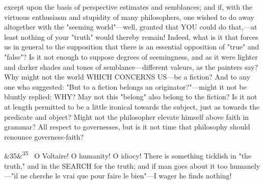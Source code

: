 \documentclass[12pt]{article}
\newcommand{\para}[1][]{\par\noindent\ifx&#1&\else\textsuperscript{\footnotesize #1}~\fi}
\begin{document}
except upon the basis of perspective estimates and semblances; and if, with the virtuous enthusiasm and stupidity of many philosophers, one wished to do away altogether with the "seeming world"---well, granted that YOU could do that,---at least nothing of your "truth" would thereby remain! Indeed, what is it that forces us in general to the supposition that there is an essential opposition of "true" and "false"? Is it not enough to suppose degrees of seemingness, and as it were lighter and darker shades and tones of semblance---different valeurs, as the painters say? Why might not the world WHICH CONCERNS US---be a fiction? And to any one who suggested: "But to a fiction belongs an originator?"---might it not be bluntly replied: WHY? May not this "belong" also belong to the fiction? Is it not at length permitted to be a little ironical towards the subject, just as towards the predicate and object? Might not the philosopher elevate himself above faith in grammar? All respect to governesses, but is it not time that philosophy should renounce governess-faith?

\para[35] O Voltaire! O humanity! O idiocy! There is something ticklish in "the truth," and in the SEARCH for the truth; and if man goes about it too humanely---"il ne cherche le vrai que pour faire le bien"---I wager he finds nothing!
\end{document}
